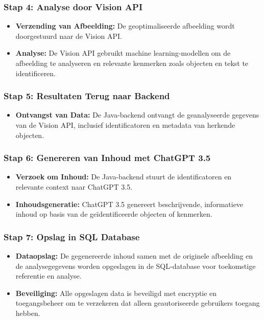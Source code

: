 \subsubsection{Stap 4: Analyse door Vision API}
\begin{itemize}
    \item \textbf{Verzending van Afbeelding:} De geoptimaliseerde afbeelding wordt doorgestuurd naar de Vision API.
    \item \textbf{Analyse:} De Vision API gebruikt machine learning-modellen om de afbeelding te analyseren en relevante kenmerken zoals objecten en tekst te identificeren.
\end{itemize}

\subsubsection{Stap 5: Resultaten Terug naar Backend}
\begin{itemize}
    \item \textbf{Ontvangst van Data:} De Java-backend ontvangt de geanalyseerde gegevens van de Vision API, inclusief identificatoren en metadata van herkende objecten.
\end{itemize}

\subsubsection{Stap 6: Genereren van Inhoud met ChatGPT 3.5}
\begin{itemize}
    \item \textbf{Verzoek om Inhoud:} De Java-backend stuurt de identificatoren en relevante context naar ChatGPT 3.5.
    \item \textbf{Inhoudsgeneratie:} ChatGPT 3.5 genereert beschrijvende, informatieve inhoud op basis van de geïdentificeerde objecten of kenmerken.
\end{itemize}

\subsubsection{Stap 7: Opslag in SQL Database}
\begin{itemize}
    \item \textbf{Dataopslag:} De gegenereerde inhoud samen met de originele afbeelding en de analysegegevens worden opgeslagen in de SQL-database voor toekomstige referentie en analyse.
    \item \textbf{Beveiliging:} Alle opgeslagen data is beveiligd met encryptie en toegangsbeheer om te verzekeren dat alleen geautoriseerde gebruikers toegang hebben.
\end{itemize}

